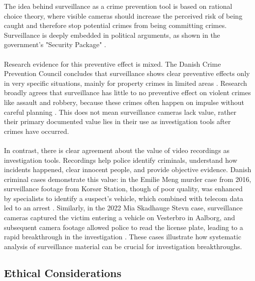 The idea behind surveillance as a crime prevention tool is based on rational choice theory, where visible cameras should increase the perceived risk of being caught and therefore stop potential crimes from being committing crimes. Surveillance is deeply embedded in political arguments, as shown in the government's "Security Package" \cite{tryghedspakke2019}.
\\\\
Research evidence for this preventive effect is mixed. The Danish Crime Prevention Council concludes that surveillance shows clear preventive effects only in very specific situations, mainly for property crimes in limited areas \cite{dkr_tv_overvaagning}. Research broadly agrees that surveillance has little to no preventive effect on violent crimes like assault and robbery, because these crimes often happen on impulse without careful planning \cite{videnskab2024}. This does not mean surveillance cameras lack value, rather their primary documented value lies in their use as investigation tools after crimes have occurred.
\\\\
In contrast, there is clear agreement about the value of video recordings as investigation tools. Recordings help police identify criminals, understand how incidents happened, clear innocent people, and provide objective evidence. Danish criminal cases demonstrate this value: in the Emilie Meng murder case from 2016, surveillance footage from Korsør Station, though of poor quality, was enhanced by specialists to identify a suspect's vehicle, which combined with telecom data led to an arrest \cite{emilie_meng_avisen,emilie_meng_wiki}. Similarly, in the 2022 Mia Skadhauge Stevn case, surveillance cameras captured the victim entering a vehicle on Vesterbro in Aalborg, and subsequent camera footage allowed police to read the license plate, leading to a rapid breakthrough in the investigation \cite{mia_stevn_avisen}. These cases illustrate how systematic analysis of surveillance material can be crucial for investigation breakthroughs.

\subsection{Ethical Considerations}

